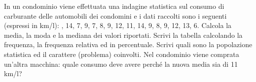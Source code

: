 \item In un condominio viene effettuata una indagine statistica sul consumo di carburante delle automobili dei condomini e i dati raccolti sono i seguenti (espressi in km/l): , 14, 7, 9, 7, 8, 9, 12, 11, 14, 9, 8, 9, 12, 13, 6. \newline
				Calcola la media, la moda e la mediana dei valori riportati. \newline
				Scrivi la tabella calcolando la frequenza, la frequenza relativa ed in percentuale.\newline
				Scrivi quali sono la popolazione statistica ed il carattere (problema) coinvolti. \newline
				Nel condominio viene comprata un'altra macchina: quale consumo deve avere perché la nuova media sia di 11 km/l? 